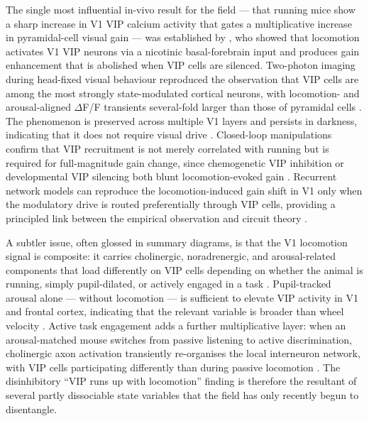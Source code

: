 \documentclass[11pt]{article}
\begin{document}
The single most influential in-vivo result for the field --- that running mice show a sharp increase in V1 VIP calcium activity that gates a multiplicative increase in pyramidal-cell visual gain --- was established by \citet{Fu2014}, who showed that locomotion activates V1 VIP neurons via a nicotinic basal-forebrain input and produces gain enhancement that is abolished when VIP cells are silenced. Two-photon imaging during head-fixed visual behaviour reproduced the observation that VIP cells are among the most strongly state-modulated cortical neurons, with locomotion- and arousal-aligned $\Delta$F/F transients several-fold larger than those of pyramidal cells \citep{Pakan2016, Dipoppa2018, Reimer2014}. The phenomenon is preserved across multiple V1 layers and persists in darkness, indicating that it does not require visual drive \citep{Pakan2016, Dipoppa2018}. Closed-loop manipulations confirm that VIP recruitment is not merely correlated with running but is required for full-magnitude gain change, since chemogenetic VIP inhibition or developmental VIP silencing both blunt locomotion-evoked gain \citep{Batistabrito2017}. Recurrent network models can reproduce the locomotion-induced gain shift in V1 only when the modulatory drive is routed preferentially through VIP cells, providing a principled link between the empirical observation and circuit theory \citep{Dipoppa2018, Veit2023}.

A subtler issue, often glossed in summary diagrams, is that the V1 locomotion signal is composite: it carries cholinergic, noradrenergic, and arousal-related components that load differently on VIP cells depending on whether the animal is running, simply pupil-dilated, or actively engaged in a task \citep{Reimer2014, Garciajuncoclemente2017, Collins2023}. Pupil-tracked arousal alone --- without locomotion --- is sufficient to elevate VIP activity in V1 and frontal cortex, indicating that the relevant variable is broader than wheel velocity \citep{Reimer2014, Garciajuncoclemente2017, Munoz2017}. Active task engagement adds a further multiplicative layer: when an arousal-matched mouse switches from passive listening to active discrimination, cholinergic axon activation transiently re-organises the local interneuron network, with VIP cells participating differently than during passive locomotion \citep{Kuchibhotla2017, Collins2023}. The disinhibitory ``VIP runs up with locomotion'' finding is therefore the resultant of several partly dissociable state variables that the field has only recently begun to disentangle.
\end{document}
